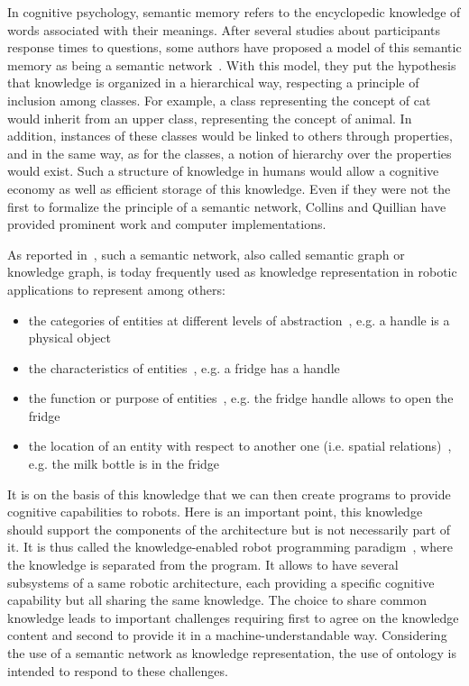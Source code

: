In cognitive psychology, semantic memory refers to the encyclopedic knowledge of words associated with their meanings. After several studies about participants response times to questions, some authors have proposed a model of this semantic memory as being a semantic network~\cite{collins_1969_retrieval, collins_1970_does}. With this model, they put the hypothesis that knowledge is organized in a hierarchical way, respecting a principle of inclusion among classes. For example, a class representing the concept of cat would inherit from an upper class, representing the concept of animal. In addition, instances of these classes would be linked to others through properties, and in the same way, as for the classes, a notion of hierarchy over the properties would exist. Such a structure of knowledge in humans would allow a cognitive economy as well as efficient storage of this knowledge. Even if they were not the first to formalize the principle of a semantic network, Collins and Quillian have provided prominent work and computer implementations.

As reported in~\cite{prasad_2020_knowledge}, such a semantic network, also called semantic graph or knowledge graph, is today frequently used as knowledge representation in robotic applications to represent among others:

\begin{itemize}
  \item the categories of entities at different levels of abstraction~\cite{balint_2018_variations}, e.g. a handle is a physical object
  \item the characteristics of entities~\cite{tenorth_2017_representations}, e.g. a fridge has a handle
  \item the function or purpose of entities~\cite{paulius_2019_functional}, e.g. the fridge handle allows to open the fridge
  \item the location of an entity with respect to another one (i.e. spatial relations)~\cite{singh_2020_fuzzy}, e.g. the milk bottle is in the fridge
\end{itemize}

It is on the basis of this knowledge that we can then create programs to provide cognitive capabilities to robots. Here is an important point, this knowledge should support the components of the architecture but is not necessarily part of it. It is thus called the knowledge-enabled robot programming paradigm~\cite{beetz_2012_cognition}, where the knowledge is separated from the program. It allows to have several subsystems of a same robotic architecture, each providing a specific cognitive capability but all sharing the same knowledge. The choice to share common knowledge leads to important challenges requiring first to agree on the knowledge content and second to provide it in a machine-understandable way. Considering the use of a semantic network as knowledge representation, the use of ontology is intended to respond to these challenges.

